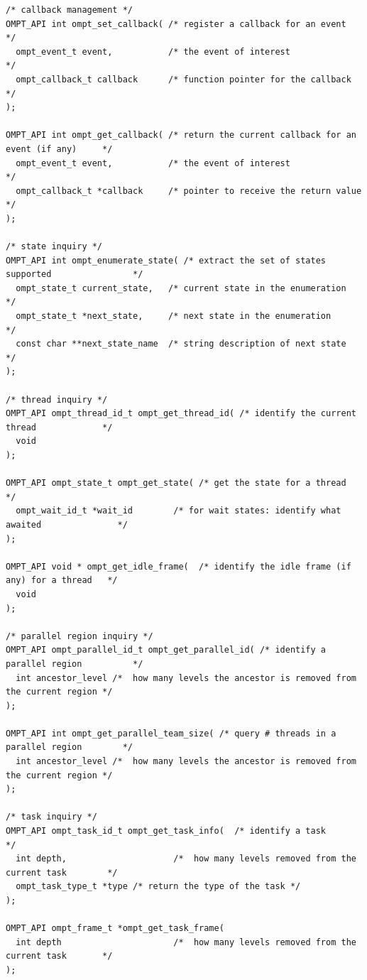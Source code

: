 \documentclass{article}
\begin{document}
\begin{verbatim}
/* callback management */
OMPT_API int ompt_set_callback( /* register a callback for an event                      */
  ompt_event_t event,           /* the event of interest                                 */
  ompt_callback_t callback      /* function pointer for the callback                     */
);

OMPT_API int ompt_get_callback( /* return the current callback for an event (if any)     */
  ompt_event_t event,           /* the event of interest                                 */
  ompt_callback_t *callback     /* pointer to receive the return value                   */
);

/* state inquiry */
OMPT_API int ompt_enumerate_state( /* extract the set of states supported                */
  ompt_state_t current_state,   /* current state in the enumeration                      */
  ompt_state_t *next_state,     /* next state in the enumeration                         */
  const char **next_state_name  /* string description of next state                      */
);

/* thread inquiry */
OMPT_API ompt_thread_id_t ompt_get_thread_id( /* identify the current thread             */
  void
);

OMPT_API ompt_state_t ompt_get_state( /* get the state for a thread                      */
  ompt_wait_id_t *wait_id        /* for wait states: identify what awaited               */
);

OMPT_API void * ompt_get_idle_frame(  /* identify the idle frame (if any) for a thread   */
  void
);

/* parallel region inquiry */
OMPT_API ompt_parallel_id_t ompt_get_parallel_id( /* identify a parallel region          */
  int ancestor_level /*  how many levels the ancestor is removed from the current region */
);

OMPT_API int ompt_get_parallel_team_size( /* query # threads in a parallel region        */
  int ancestor_level /*  how many levels the ancestor is removed from the current region */
);

/* task inquiry */
OMPT_API ompt_task_id_t ompt_get_task_info(  /* identify a task                           */
  int depth,                     /*  how many levels removed from the current task        */
  ompt_task_type_t *type /* return the type of the task */
);

OMPT_API ompt_frame_t *ompt_get_task_frame(
  int depth                      /*  how many levels removed from the current task       */
);


\end{verbatim}
\end{document}
